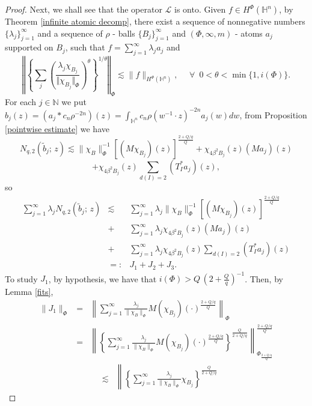 \documentclass[oneside,10pt]{article}
\begin{document}
\begin{proof}
Next, we shall see that the operator $\mathcal{L}$ is onto. Given $f \in H^{\Phi}(\mathbb{H}^{n})$, by Theorem \ref{infinite atomic decomp}, there exist a sequence of nonnegative numbers $\{ \lambda_j \}_{j=1}^{\infty}$ and a sequence of $\rho$ - balls $\{B_j \}_{j=1}^{\infty}$ and 
$(\Phi, \infty, m)$ - atoms $a_j$ supported on $B_j$, such that $f= \sum_{j=1}^{\infty} \lambda_j a_j$ and
\begin{equation} \label{atomic ineq}
\left\Vert \left\{ \sum_{j} \left( \frac{\lambda_j \chi_{B_j}}{\Vert \chi_{B_j} \Vert_{\Phi}} \right)^{\theta} \right\}^{1/\theta} 
\right\Vert_{\Phi} \lesssim \|f \|_{H^{\Phi}(\mathbb{H}^{n})}, \,\,\,\,\,\,\,\, \forall \,\,\, 0 < \theta < \min \{ 1, i(\Phi) \}.
\end{equation}
For each $j \in \mathbb{N}$ we put $b_j(z)= (a_j \ast c_n \rho^{-2n})(z) = \int_{\mathbb{H}^{n}} c_n \rho(w^{-1} \cdot z)^{-2n} a_j(w) dw$, from Proposition \ref{pointwise estimate} we have
\[
N_{q, 2} \left(\widetilde{b}_j; \, z \right) \lesssim \| \chi_B \|^{-1}_{\Phi} \left[(M \chi_{B_j})(z) \right]^{\frac{2 + Q/q}{Q}} + 
\chi_{4 \beta^2 B_j}(z) (M a_j)(z) 
\]
\[
+ \chi_{4 \beta^2 B_j}(z) \sum_{d(I)=2} (T^{*}_{I} a_j)(z),
\]
so
\begin{eqnarray*}
\sum_{j=1}^{\infty} \lambda_j N_{q, 2} \left(\widetilde{b}_j; \, z \right) &\lesssim& \sum_{j=1}^{\infty} \lambda_j \| \chi_B \|^{-1}_{\Phi} 
\left[(M \chi_{B_j})(z) \right]^{\frac{2 + Q/q}{Q}} \\
&+& \sum_{j=1}^{\infty} \lambda_j \chi_{4 \beta^2 B_j}(z) (M a_j)(z) \\
&+& \sum_{j=1}^{\infty} \lambda_j \chi_{4 \beta^2 B_j}(z) \sum_{d(I)=2} (T^{*}_{I} a_j)(z) \\
&=:& J_1 + J_2 + J_3.
\end{eqnarray*}
To study $J_1$, by hypothesis, we have that $i(\Phi) > Q \, (2 + \frac{Q}{q})^{-1}$. Then, by Lemma \ref{fits},
\begin{eqnarray*}
\|J_1\|_{\Phi} & = & \left\| \sum_{j=1}^{\infty} \frac{\lambda_j}{\| \chi_B \|_{\Phi}} M(\chi_{B_j})(\cdot)^{\frac{2 + Q/q}{Q}} 
\right\|_{\Phi} \\
& = & \left\| \left\{ \sum_{j=1}^{\infty} \frac{\lambda_j}{\| \chi_B \|_{\Phi}} M(\chi_{B_j})(\cdot)^{\frac{2 + Q/q}{Q}} 
\right\}^{\frac{Q}{2 + Q/q}} \right\|_{\Phi_{\frac{2 + Q/q}{Q}}}^{\frac{2 + Q/q}{Q}}
\end{eqnarray*}
\begin{eqnarray*}
& \lesssim & \left\| \left\{ \sum_{j=1}^{\infty} \frac{\lambda_j}{\| \chi_B \|_{\Phi}} \chi_{B_j}  \right\}^{\frac{Q}{2 + Q/q}} 

\end{eqnarray*}
\end{proof}
\end{document}
